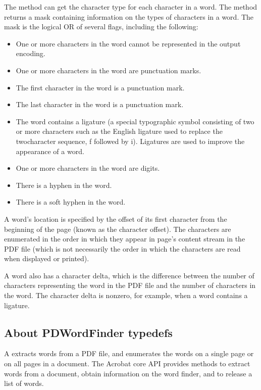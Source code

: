 \documentclass[letterpaper,12pt,english,openany,oneside]{sphinxmanual}
\begin{document}
The  method can get the character type for each character in a word. The  method returns a mask containing information on the types of characters in a word. The mask is the logical OR of several flags, including the following:
\begin{itemize}
\item {} 
One or more characters in the word cannot be represented in the output encoding.

\item {} 
One or more characters in the word are punctuation marks.

\item {} 
The first character in the word is a punctuation mark.

\item {} 
The last character in the word is a punctuation mark.

\item {} 
The word contains a ligature (a special typographic symbol consisting of two or more characters such as the English ligature used to replace the two\sphinxhyphen{}character sequence, f followed by i). Ligatures are used to improve the appearance of a word.

\item {} 
One or more characters in the word are digits.

\item {} 
There is a hyphen in the word.

\item {} 
There is a soft hyphen in the word.

\end{itemize}

A word’s location is specified by the offset of its first character from the beginning of the page (known as the character offset). The characters are enumerated in the order in which they appear in page’s content stream in the PDF file (which is not necessarily the order in which the characters are read when displayed or printed).

A word also has a character delta, which is the difference between the number of characters representing the word in the PDF file and the number of characters in the word. The character delta is non\sphinxhyphen{}zero, for example, when a word contains a ligature.


\subsection{About PDWordFinder typedefs}
\label{\detokenize{Plugins_Words:about-pdwordfinder-typedefs}}
A  extracts words from a PDF file, and enumerates the words on a single page or on all pages in a document. The Acrobat core API provides methods to extract words from a document, obtain information on the word finder, and to release a list of words.
\end{document}
